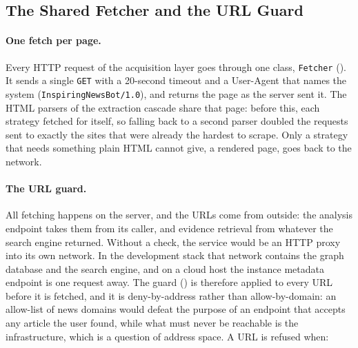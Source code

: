 
\subsection{The Shared Fetcher and the URL Guard}
\label{subsec:scraping-fetcher}

\paragraph{One fetch per page.} Every HTTP request of the acquisition
layer goes through one class, \texttt{Fetcher}
(). It sends a single \texttt{GET}
with a 20-second timeout and a User-Agent that names the system
(\texttt{InspiringNewsBot/1.0}), and returns the page as the server
sent it. The HTML parsers of the extraction cascade share that page:
before this, each strategy fetched for itself, so falling back to a
second parser doubled the requests sent to exactly the sites that were
already the hardest to scrape. Only a strategy that needs something
plain HTML cannot give, a rendered page, goes back to the network.

\paragraph{The URL guard.} All fetching happens on the server, and the
URLs come from outside: the analysis endpoint takes them from its
caller, and evidence retrieval from whatever the search engine
returned. Without a check, the service would be an HTTP proxy into its
own network. In the development stack that network contains the graph
database and the search engine, and on a cloud host the instance
metadata endpoint is one request away. The guard
() is therefore applied to every
URL before it is fetched, and it is deny-by-address rather than
allow-by-domain: an allow-list of news domains would defeat the purpose
of an endpoint that accepts any article the user found, while what must
never be reachable is the infrastructure, which is a question of
address space. A URL is refused when:

